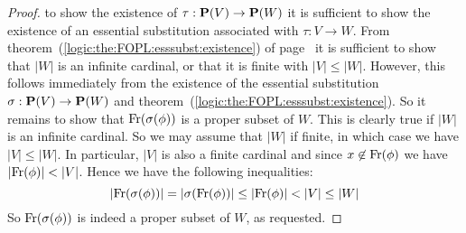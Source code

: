 \begin{proof}
to show the existence of $\tau:\mbox{${\bf P}(V)$}\to{\bf P}(W)$ it is sufficient to
show the existence of an essential substitution associated with
$\tau:V\to W$. From
theorem~(\ref{logic:the:FOPL:esssubst:existence}) of
page~\pageref{logic:the:FOPL:esssubst:existence} it is sufficient to
show that $|W|$ is an infinite cardinal, or that it is finite with
$|V|\leq|W|$. However, this follows immediately from the existence
of the essential substitution $\sigma:\mbox{${\bf P}(V)$}\to{\bf P}(W)$ and
theorem~(\ref{logic:the:FOPL:esssubst:existence}). So it remains to
show that $\mbox{\rm Fr}(\sigma(\phi))$ is a proper subset of $W$. This is
clearly true if $|W|$ is an infinite cardinal. So we may assume that
$|W|$ if finite, in which case we have $|V|\leq |W|$. In particular,
$|V|$ is also a finite cardinal and since $x\not\in\mbox{\rm Fr}(\phi)$ we
have $|\free(\phi)|<|V|$. Hence we have the following inequalities:
    \[
    |\free(\sigma(\phi))|=|\sigma(\free(\phi))|\leq|\free(\phi)|<|V|\leq|W|
    \]
So $\mbox{\rm Fr}(\sigma(\phi))$ is indeed a proper subset of $W$, as
requested.
\end{proof}
